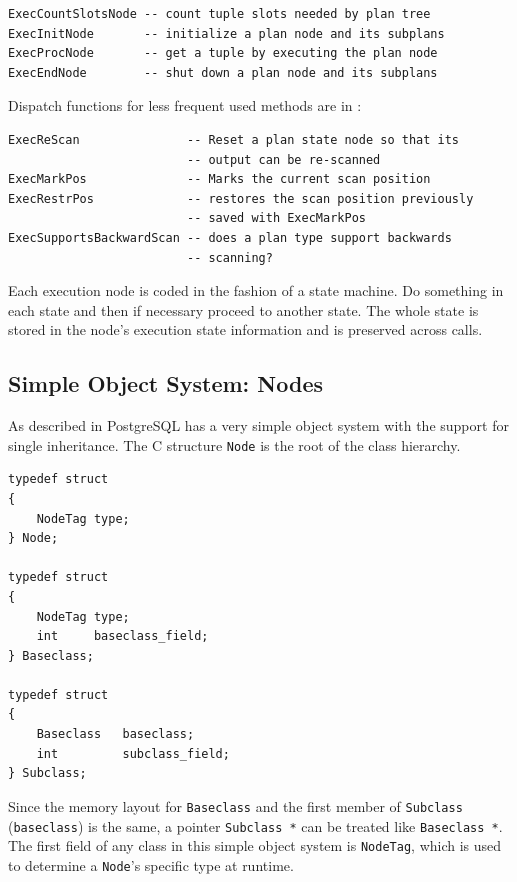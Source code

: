 \begin{lstlisting}[language=pseudo,numbers=none]
ExecCountSlotsNode -- count tuple slots needed by plan tree
ExecInitNode       -- initialize a plan node and its subplans
ExecProcNode       -- get a tuple by executing the plan node
ExecEndNode        -- shut down a plan node and its subplans
\end{lstlisting}

\noindent
Dispatch functions for less frequent used methods are in
:

\begin{lstlisting}[language=pseudo,numbers=none]
ExecReScan               -- Reset a plan state node so that its 
                         -- output can be re-scanned
ExecMarkPos              -- Marks the current scan position
ExecRestrPos             -- restores the scan position previously
                         -- saved with ExecMarkPos
ExecSupportsBackwardScan -- does a plan type support backwards
                         -- scanning?
\end{lstlisting}

\noindent
Each execution node is coded in the fashion of a state machine.  Do
something in each state and then if necessary proceed to another
state.  The whole state is stored in the node's execution state
information and is preserved across calls.

\subsection{Simple Object System: Nodes}
\label{sec:simple-object-system}
As described in \citep[Page 12-14]{Conway2006a} PostgreSQL has a very
simple object system with the support for single inheritance.
The C structure \texttt{Node} is the root of the class hierarchy.

\pagebreak[2]

\begin{lstlisting}[language=pseudo,
caption={PostgreSQL simple object system},
label={code:simple-object-system}
]
typedef struct
{
	NodeTag type;
} Node;

typedef struct
{
	NodeTag	type;
	int		baseclass_field;
} Baseclass;

typedef struct
{
	Baseclass	baseclass;
	int			subclass_field;
} Subclass;
\end{lstlisting}

Since the memory layout for \texttt{Baseclass} and the first member of
\texttt{Subclass} (\texttt{baseclass}) is the same, a pointer \texttt{Subclass *}
can be treated like \texttt{Baseclass *}.  The first field of any class
in this simple object system is \texttt{NodeTag}, which is used to determine
a \texttt{Node}'s specific type at runtime.

